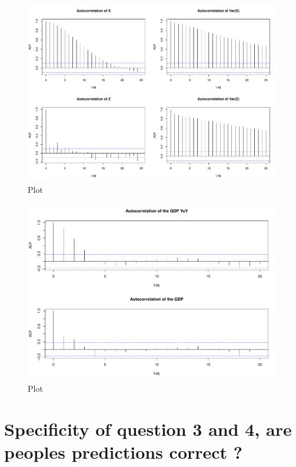 \documentclass[12pt,a4paper,oneside]{book}
\begin{document}
\begin{figure}[H]
    \centering
    \captionsetup{justification=centering}
    \includegraphics[scale=0.5]{Graphs/ACF.pdf}
    \caption{Plot }
    \label{ACF}
\end{figure}

\begin{figure}[H]
    \centering
    \captionsetup{justification=centering}
    \includegraphics[scale=0.45]{Graphs/ACF_GDP.pdf}
    \caption{Plot }
    \label{ACF_GDP}
\end{figure}

\newpage

\section{Specificity of question 3 and 4, are peoples predictions correct ?}
\end{document}
